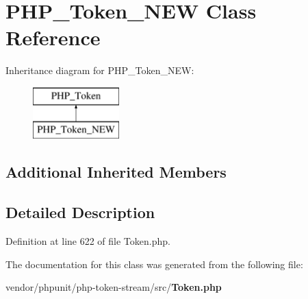 \section{P\+H\+P\+\_\+\+Token\+\_\+\+N\+E\+W Class Reference}
\label{class_p_h_p___token___n_e_w}
Inheritance diagram for P\+H\+P\+\_\+\+Token\+\_\+\+N\+E\+W\+:\begin{figure}[H]
\begin{center}
\leavevmode
\includegraphics[height=2.000000cm]{class_p_h_p___token___n_e_w}
\end{center}
\end{figure}
\subsection*{Additional Inherited Members}


\subsection{Detailed Description}


Definition at line 622 of file Token.\+php.



The documentation for this class was generated from the following file\+:\begin{DoxyCompactItemize}
\item 
vendor/phpunit/php-\/token-\/stream/src/{\bf Token.\+php}\end{DoxyCompactItemize}
